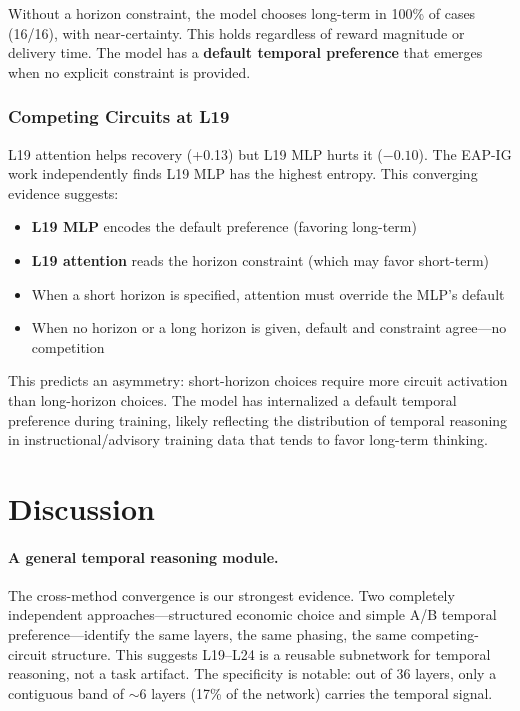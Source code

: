 \documentclass{article}
\begin{document}
Without a horizon constraint, the model chooses long-term in 100\% of cases (16/16), with near-certainty. This holds regardless of reward magnitude or delivery time. The model has a \textbf{default temporal preference} that emerges when no explicit constraint is provided.

\subsubsection{Competing Circuits at L19}

L19 attention helps recovery (+0.13) but L19 MLP hurts it ($-0.10$). The EAP-IG work independently finds L19 MLP has the highest entropy. This converging evidence suggests:

\begin{itemize}
    \item \textbf{L19 MLP} encodes the default preference (favoring long-term)
    \item \textbf{L19 attention} reads the horizon constraint (which may favor short-term)
    \item When a short horizon is specified, attention must override the MLP's default
    \item When no horizon or a long horizon is given, default and constraint agree---no competition
\end{itemize}

This predicts an asymmetry: short-horizon choices require more circuit activation than long-horizon choices. The model has internalized a default temporal preference during training, likely reflecting the distribution of temporal reasoning in instructional/advisory training data that tends to favor long-term thinking.

\section{Discussion}

\paragraph{A general temporal reasoning module.} The cross-method convergence is our strongest evidence. Two completely independent approaches---structured economic choice and simple A/B temporal preference---identify the same layers, the same phasing, the same competing-circuit structure. This suggests L19--L24 is a reusable subnetwork for temporal reasoning, not a task artifact. The specificity is notable: out of 36 layers, only a contiguous band of $\sim$6 layers (17\% of the network) carries the temporal signal.
\end{document}
